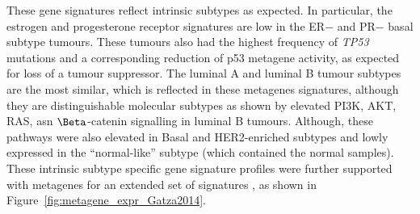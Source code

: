 \begin{figure}[!htp]
\noindent{} %
\end{figure}

These gene signatures reflect intrinsic subtypes as expected. In particular, the estrogen and progesterone receptor signatures are low in the ER$-$ and PR$-$ basal subtype tumours. These tumours also had the highest frequency of \textit{TP53} mutations and a corresponding reduction of p53 metagene activity, as expected for loss of a tumour suppressor. The luminal A and luminal B tumour subtypes are the most similar, which is reflected in these metagenes signatures, although they are distinguishable molecular subtypes as shown by elevated PI3K, AKT, RAS, asn $\Beta$-catenin signalling in luminal B tumours. Although, these pathways were also elevated in Basal and HER2-enriched subtypes and lowly expressed in the ``normal-like'' subtype (which contained the normal samples). These intrinsic subtype specific gene signature profiles were further supported with metagenes for an extended set of signatures \citep{Gatza2014}, as shown in Figure~\ref{fig:metagene_expr_Gatza2014}.

